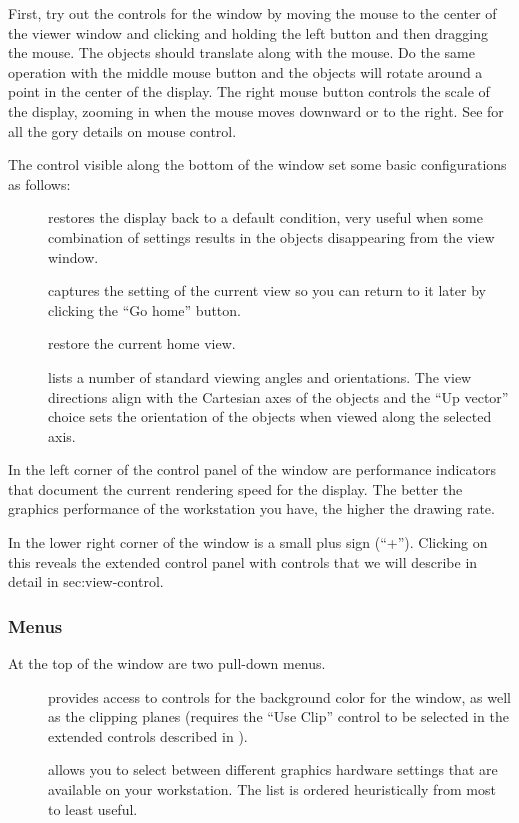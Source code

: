 First, try out the controls for the \graphics{} window by moving the mouse
to the center of the viewer window and clicking and holding the left button
and then dragging the mouse.  The objects should translate along with the
mouse.  Do the same operation with the middle mouse button and the objects
will rotate around a point in the center of the display.  The right mouse
button controls the scale of the display, zooming in when the mouse moves
downward or to the right.  See  for all the gory details on mouse control.

The control visible along the bottom of the \viewer{} window set some basic
configurations as follows:
%
\begin{description}
  \item [ ] restores the display back to a default
        condition, very useful when some combination of settings results in
        the objects disappearing from the view window.
  \item [ ] captures the setting of the current view
        so you 
        can return to it later by clicking the ``Go home'' button.
  \item [ ] restore the current home view.
  \item [ ] lists a number of standard viewing angles and
        orientations.  The view directions align with the Cartesian axes
        of the objects and the ``Up vector'' choice sets the orientation of
        the objects when viewed along the selected axis.
\end{description}

In the left corner of the control panel of the \viewer{} window are
performance indicators that document the current rendering speed for the
display.  The better the graphics performance of the workstation you
have, the higher the drawing rate.

In the lower right corner of the \viewer{} window is a small plus sign
(``+'').  Clicking on this reveals the extended control panel with controls
that we will describe in detail in 
{sec:view-control}.



\subsubsection{Menus}

At the top of the \viewer{} window are two pull-down menus.
\begin{description}
  \item [ ] provides access to controls for the background
        color for the window, as well as the clipping planes (requires the
        ``Use Clip'' control to be selected in the extended controls
        described in ).
  \item [ ] allows you to select between different graphics
        hardware settings that are available on your workstation.  The list
        is ordered heuristically from most to least useful.
\end{description}

